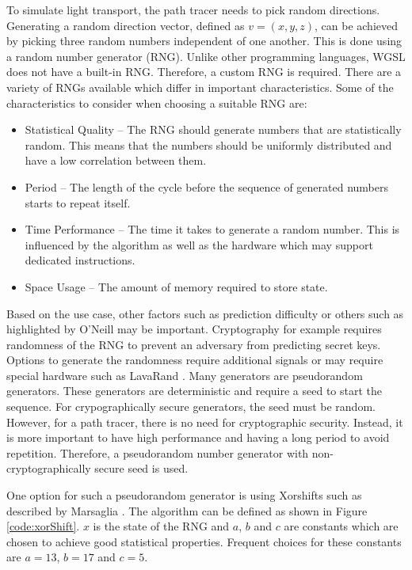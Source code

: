 To simulate light transport, the path tracer needs to pick random directions. Generating a random direction vector, defined as $v = (x, y, z)$, can be achieved by picking three random numbers independent of one another. This is done using a random number generator (RNG). Unlike other programming languages, WGSL does not have a built-in RNG. Therefore, a custom RNG is required. There are a variety of RNGs available which differ in important characteristics. Some of the characteristics to consider when choosing a suitable RNG are:

\begin{itemize}
    \item{Statistical Quality} – The RNG should generate numbers that are statistically random. This means that the numbers should be uniformly distributed and have a low correlation between them.
    \item{Period} – The length of the cycle before the sequence of generated numbers starts to repeat itself.
    \item{Time Performance} – The time it takes to generate a random number. This is influenced by the algorithm as well as the hardware which may support dedicated instructions.
    \item{Space Usage} – The amount of memory required to store state.
\end{itemize}

Based on the use case, other factors such as prediction difficulty or others such as highlighted by O’Neill \cite{o2014pcg} may be important. Cryptography for example requires randomness of the RNG to prevent an adversary from predicting secret keys. Options to generate the randomness require additional signals \cite{randomnessCryptography} or may require special hardware such as LavaRand \cite{cloudflareLavaRand}. Many generators are pseudorandom generators. These generators are deterministic and require a seed to start the sequence. For crypographically secure generators, the seed must be random.
However, for a path tracer, there is no need for cryptographic security. Instead, it is more important to have high performance and having a long period to avoid repetition. Therefore, a pseudorandom number generator with non-cryptographically secure seed is used.

One option for such a pseudorandom generator is using Xorshifts such as described by Marsaglia \cite{marsaglia2003xorshift}. The algorithm can be defined as shown in Figure \ref{code:xorShift}. $x$ is the state of the RNG and $a$, $b$ and $c$ are constants which are chosen to achieve good statistical properties. Frequent choices for these constants are $a = 13$, $b = 17$ and $c = 5$.

